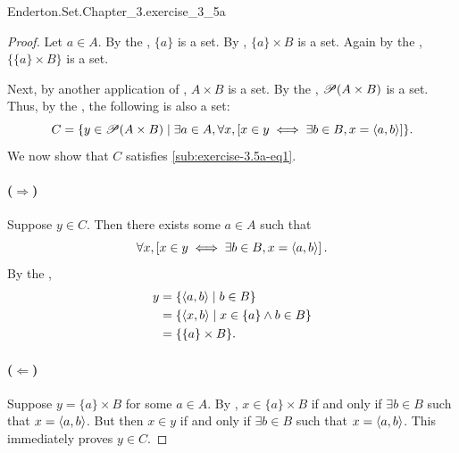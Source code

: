 \documentclass{report}
\begin{document}
    {Enderton.Set.Chapter\_3.exercise\_3\_5a}

  \begin{proof}
    Let $a \in A$.
    By the , $\{a\}$ is a set.
    By , $\{a\} \times B$ is a set.
    Again by the , $\{\{a\} \times B\}$ is a set.

    Next, by another application of , $A \times B$
      is a set.
    By the , $\mathscr{P}(A \times B)$ is a set.
    Thus, by the , the following is also a set:
      $$C = \{ y \in \mathscr{P}(A \times B) \mid
        \exists a \in A, \forall x, \left[ x \in y \iff
          \exists b \in B, x = \left< a, b \right> \right] \}.$$
    We now show that $C$ satisfies \eqref{sub:exercise-3.5a-eq1}.

    \paragraph{($\Rightarrow$)}%

      Suppose $y \in C$.
      Then there exists some $a \in A$ such that
        $$\forall x, \left[ x \in y \iff
          \exists b \in B, x = \left< a, b \right> \right].$$
      By the ,
        \begin{align*}
          y
            & = \{ \left< a, b \right> \mid b \in B \} \\
            & = \{ \left< x, b \right> \mid x \in \{a\} \land b \in B \} \\
            & = \{ \{a\} \times B \}.
        \end{align*}

    \paragraph{($\Leftarrow$)}%

      Suppose $y = \{a\} \times B$ for some $a \in A$.
      By , $x \in \{a\} \times B$ if and only if
        $\exists b \in B$ such that $x = \left< a, b \right>$.
      But then $x \in y$ if and only if $\exists b \in B$ such that
        $x = \left< a, b \right>$.
      This immediately proves $y \in C$.

  \end{proof}

\subsection{}%
\end{document}
